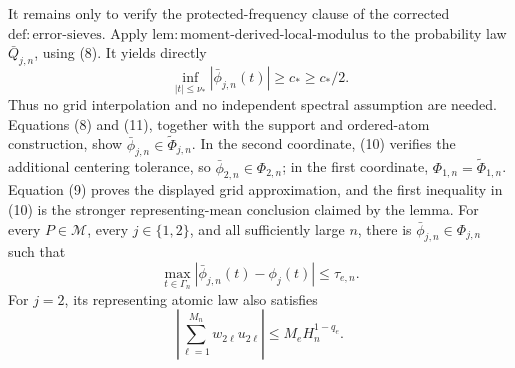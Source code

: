 It remains only to verify the protected-frequency clause of the corrected
\(\mathrm{def{:}error\text{-}sieves}\).  Apply
\(\mathrm{lem{:}moment\text{-}derived\text{-}local\text{-}modulus}\) to
the probability law \(\bar Q_{j,n}\), using (8).  It yields directly
\[
 \inf_{|t|\le\nu_*}|\bar\phi_{j,n}(t)|
 \ge c_*\ge c_*/2.                                                 \tag{11}
\]
Thus no grid interpolation and no independent spectral assumption are
needed.  Equations (8) and (11), together with the support and ordered-atom
construction, show
\(\bar\phi_{j,n}\in\widetilde\Phi_{j,n}\).  In the second coordinate,
(10) verifies the additional centering tolerance, so
\(\bar\phi_{2,n}\in\Phi_{2,n}\); in the first coordinate,
\(\Phi_{1,n}=\widetilde\Phi_{1,n}\).  Equation (9) proves the displayed
grid approximation, and the first inequality in (10) is the stronger
representing-mean conclusion claimed by the lemma.
For every \(P\in\mathcal M\), every \(j\in\{1,2\}\), and all sufficiently
large \(n\), there is \(\bar\phi_{j,n}\in\Phi_{j,n}\) such that
\[
 \max_{t\in\Gamma_n}|\bar\phi_{j,n}(t)-\phi_j(t)|\le\tau_{e,n}.
\]
For \(j=2\), its representing atomic law also satisfies
\[
 \left|\sum_{\ell=1}^{M_n}w_{2\ell}u_{2\ell}\right|
 \le M_eH_n^{1-q_e}.
\]
